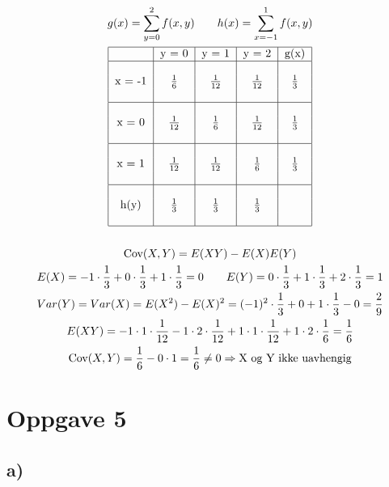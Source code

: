 \begin{gather*}
	g(x) = \sum_{y = 0}^2{f(x, y)}
	\qquad
	h(x) = \sum_{x = -1}^1{f(x, y)}
	\\
	\begin{tabular}{| c | c | c | c | c |}
		\hline
				& y = 0			& y = 1				& y = 2				& g(x)			\\
		\hline
		&&&&\\
		x = -1	& $\frac{1}{6}$	& $\frac{1}{12}$	& $\frac{1}{12}$	& $\frac{1}{3}$	\\
		&&&&\\
		\hline
		&&&&\\
		x = 0	& $\frac{1}{12}$	& $\frac{1}{6}$	& $\frac{1}{12}$	& $\frac{1}{3}$	\\
		&&&&\\
		\hline
		&&&&\\
		x = 1	& $\frac{1}{12}$	& $\frac{1}{12}$	& $\frac{1}{6}$	& $\frac{1}{3}$	\\
		&&&&\\
		\hline
		&&&&\\
		h(y)	& $\frac{1}{3}$		& $\frac{1}{3}$		& $\frac{1}{3}$	&				\\
		&&&&\\
		\hline
	\end{tabular}
	\\
	\\
	\text{Cov}(X, Y) = E(X Y) - E(X) E(Y)
	\\
	E(X) = -1 \cdot \frac{1}{3} + 0 \cdot \frac{1}{3} + 1 \cdot \frac{1}{3} = 0
	\qquad
	E(Y) = 0 \cdot \frac{1}{3} + 1 \cdot \frac{1}{3} + 2 \cdot \frac{1}{3} = 1
	\\
	Var(Y) = Var(X) = E(X^2) - E(X)^2 = (-1)^2 \cdot \frac{1}{3} + 0 + 1 \cdot \frac{1}{3} - 0 = \frac{2}{9}
	\\
	E(X Y) = -1 \cdot 1 \cdot \frac{1}{12} - 1 \cdot 2 \cdot \frac{1}{12} + 1 \cdot 1 \cdot \frac{1}{12} + 1 \cdot 2 \cdot \frac{1}{6} = \frac{1}{6}
	\\
	\text{Cov}(X, Y) = \frac{1}{6} - 0 \cdot 1 = \frac{1}{6} \neq 0 \Rightarrow \text{X og Y ikke uavhengig}
\end{gather*}


\newpage


\section*{Oppgave 5}


\subsection*{a)}


